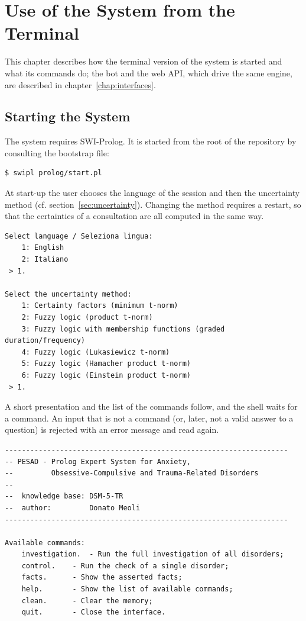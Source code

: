 \chapter{Use of the System from the Terminal}
\label{chap:usage}

This chapter describes how the terminal version of the system is started and
what its commands do; the bot and the web API, which drive the same engine, are
described in chapter~\ref{chap:interfaces}.


\section{Starting the System}

The system requires SWI-Prolog. It is started from the root of the repository
by consulting the bootstrap file:
\begin{lstlisting}
$ swipl prolog/start.pl
\end{lstlisting}
At start-up the user chooses the language of the session and then the
uncertainty method (cf. section~\ref{sec:uncertainty}). Changing the method requires a restart, so that the certainties of a consultation are all
computed in the same way.
\begin{lstlisting}
Select language / Seleziona lingua:
	1: English
	2: Italiano
 > 1.

Select the uncertainty method:
	1: Certainty factors (minimum t-norm)
	2: Fuzzy logic (product t-norm)
	3: Fuzzy logic with membership functions (graded duration/frequency)
	4: Fuzzy logic (Lukasiewicz t-norm)
	5: Fuzzy logic (Hamacher product t-norm)
	6: Fuzzy logic (Einstein product t-norm)
 > 1.
\end{lstlisting}
A short presentation and the list of the commands follow, and the shell waits
for a command. An input that is not a command (or, later, not a valid answer to
a question) is rejected with an error message and read again.
\begin{lstlisting}
-------------------------------------------------------------------
-- PESAD - Prolog Expert System for Anxiety,
--         Obsessive-Compulsive and Trauma-Related Disorders
--
--	knowledge base: DSM-5-TR
--	author:         Donato Meoli
-------------------------------------------------------------------

Available commands:
	investigation.	- Run the full investigation of all disorders;
	control.	- Run the check of a single disorder;
	facts.		- Show the asserted facts;
	help.		- Show the list of available commands;
	clean.		- Clear the memory;
	quit.		- Close the interface.
\end{lstlisting}


